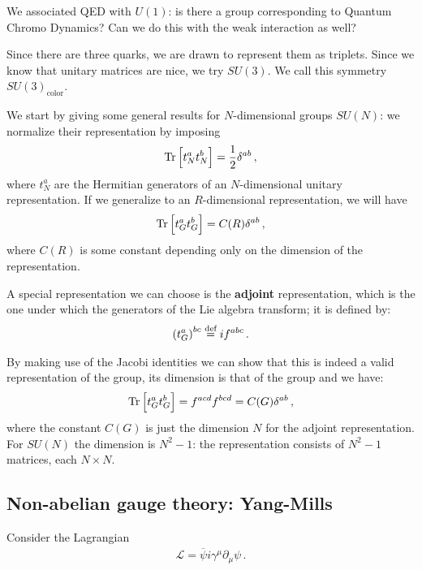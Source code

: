 \documentclass[main.tex]{subfiles}
\begin{document}
We associated QED  with \(U(1)\): is there a group corresponding to Quantum Chromo Dynamics?
Can we do this with the weak interaction as well? 

Since there are three quarks, we are drawn to represent them as triplets. 
Since we know that unitary matrices are nice, we try \(SU(3)\). 
We call this symmetry \(SU(3)_{\text{color}}\). 

We start by giving some general results for \(N\)-dimensional groups \(SU(N)\): we normalize their representation by imposing
%
\begin{align}
\Tr \qty[t^{a}_{N} t^{b}_{N}] = \frac{1}{2} \delta^{ab}
\,,
\end{align}
%
where \(t^{a}_{N}\) are the Hermitian generators of an \(N\)-dimensional unitary representation. If we generalize to an \(R\)-dimensional representation, we will have 
%
\begin{align}
\Tr \qty[t^{a}_{G} t^{b}_{G}] = C(R) \delta^{ab}
\,,
\end{align}
%
where \(C(R)\) is some constant depending only on the dimension of the representation. 

A special representation we can choose is the \textbf{adjoint} representation, which is the one under which the generators of the Lie algebra transform; it is defined by: 
%
\begin{align}
\qty(t^{a}_{G})^{bc} \overset{\text{def}}{=} i f^{abc}
\,.
\end{align}

By making use of the Jacobi identities we can show that this is indeed a valid representation of the group, its dimension is that of the group and we have:
%
\begin{align}
\Tr \qty[t^{a}_{G} t^{b}_{G}] = f^{acd} f^{bcd} = C(G) \delta^{ab}
\,,
\end{align}
%
where the constant \(C(G)\) is just the dimension \(N\) for the adjoint representation.
For \(SU(N)\) the dimension is \(N^2 - 1\): the representation consists of \(N^2-1\) matrices, each \(N \times N\).

\subsection{Non-abelian gauge theory: Yang-Mills}

Consider the Lagrangian 
%
\begin{align}
\mathscr{L} = \overline{\psi} i \gamma^{\mu } \partial_{\mu }  \psi 
\,.
\end{align}
\end{document}
